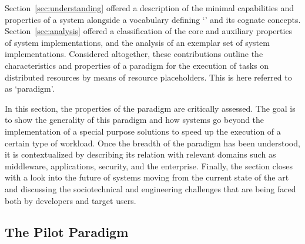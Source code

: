 \documentclass{sig-alternate}
\begin{document}

Section~\ref{sec:understanding} offered a description of the minimal
capabilities and properties of a \pilot system alongside a vocabulary defining
`\pilot' and its cognate concepts. Section~\ref{sec:analysis} offered a
classification of the core and auxiliary properties of \pilot system
implementations, and the analysis of an exemplar set of \pilot system
implementations. Considered altogether, these contributions outline the
characteristics and properties of a paradigm for the execution of tasks on
distributed resources by means of resource placeholders. This is here referred
to as `\pilot paradigm'.

In this section, the properties of the \pilot paradigm are critically assessed.
The goal is to show the generality of this paradigm and how \pilot systems go
beyond the implementation of a special purpose solutions to speed up the
execution of a certain type of workload. Once the breadth of the \pilot paradigm
has been understood, it is contextualized by describing its relation with
relevant domains such as middleware, applications, security, and the enterprise.
Finally, the section closes with a look into the future of \pilot systems moving
from the current state of the art and discussing the sociotechnical and
engineering challenges that are being faced both by developers and target users.


%
\subsection{The Pilot Paradigm}
\label{sec:paradigm}
\end{document}
